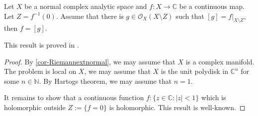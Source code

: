 \begin{proposition}\label{prop-Rado}
    Let $X$ be a normal complex analytic space and $f:X\rightarrow \mathbb{C}$ be a continuous map. Let $Z=f^{-1}(0)$. Assume that there is $g\in \mathcal{O}_X(X\setminus Z)$ such that $[g]=f|_{X\setminus Z}$, then $f=[g]$. 
\end{proposition}
This result is proved in \cite{Car52}.
\begin{proof}
    By \cref{cor-Riemannextnormal}, we may assume that $X$ is a complex manifold.
    The problem is local on $X$, we may assume that $X$ is the unit polydisk in $\mathbb{C}^n$ for some $n\in \mathbb{N}$. By Hartogs theorem, we may assume that $n=1$.

    It remains to show that a continuous function $f:\{z\in \mathbb{C}:|z|<1\}$ which  is holomorphic outside $Z:=\{f=0\}$ is holomorphic. This result is well-known.
 \end{proof}


\printbibliography



\iffalse

